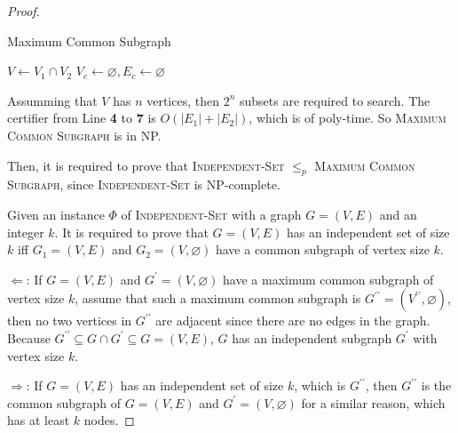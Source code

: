 \documentclass[12pt,a4paper]{article}
\theoremstyle{definition}
\begin{document}
\begin{enumerate}
\begin{proof}
        \begin{algorithm}[h]
            \caption{Maximum Common Subgraph}
            \label{alg:mcs}
            \BlankLine
            $V\leftarrow V_1\cap V_2$\;
            $V_c\leftarrow\varnothing, E_c\leftarrow \varnothing$\;
            \;
        \end{algorithm}

        Assumming that $V$ has $n$ vertices, then $2^n$ subsets are required to search. The certifier from Line \textbf{4} to \textbf{7} is $O(|E_1|+|E_2|)$, which is of poly-time. So \textsc{Maximum Common Subgraph} is in NP.

        Then, it is required to prove that \textsc{Independent-Set} $\leq_p$ \textsc{Maximum Common Subgraph}, since \textsc{Independent-Set} is NP-complete.

        Given an instance $\Phi$ of \textsc{Independent-Set} with a graph $G=(V,E)$ and an integer $k$. It is required to prove that $G=(V,E)$ has an independent set of size $k$ iff $G_1=(V,E)$ and $G_2=(V,\varnothing)$ have a common subgraph of vertex size $k$.

        $\Leftarrow$: If $G=(V,E)$ and $G^\prime=(V,\varnothing)$ have a maximum common subgraph of vertex size $k$, assume that such a maximum common subgraph is $G^{\prime\prime}=(V^{\prime\prime}, \varnothing)$, then no two vertices in $G^{\prime\prime}$ are adjacent since there are no edges in the graph. Because $G^{\prime\prime} \subseteq G \cap G^\prime \subseteq G=(V,E)$, $G$ has an independent subgraph $G^\prime$ with vertex size $k$.  

        $\Rightarrow$: If $G=(V,E)$ has an independent set of size $k$, which is $G^{\prime\prime}$, then $G^{\prime\prime}$ is the common subgraph of $G=(V,E)$ and $G^\prime=(V,\varnothing)$ for a similar reason, which has at least $k$ nodes.


\end{proof}
\end{enumerate}
\end{document}
